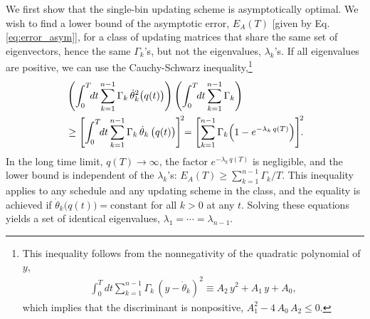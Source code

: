 \documentclass[reprint, superscriptaddress, floatfix]{revtex4-1}
\newcommand{\Err}{E}
\begin{document}
We first show
that the single-bin updating scheme is asymptotically optimal.
%
We wish to find a lower bound of the asymptotic error,
$\Err_A(T)$ [given by Eq. \eqref{eq:error_asym}],
for a class of updating matrices that
share the same set of eigenvectors,
hence the same $\Gamma_k$'s,
but not the eigenvalues,
$\lambda_k$'s.
%
If all eigenvalues are positive,
we can use the Cauchy-Schwarz inequality,\footnote{This
  inequality follows from the nonnegativity of
  the quadratic polynomial of $y$,
  \begin{align*}
  \int_0^T \!\!dt \sum_{k = 1}^{n-1} \Gamma_k \,
      ( y - {\dot \theta}_k )^2
    \equiv
    A_2 \, y^2 + A_1 \, y + A_0
    ,
  \end{align*}
  which implies that the discriminant is nonpositive,
  $A_1^2 - 4 \, A_0 \, A_2 \le 0$.}
%
%
\begin{align}
  &
  \left(
    \int_0^T \!\!dt
      \sum_{k = 1}^{n-1}
        \Gamma_k \, {\dot \theta}_k^2\bigl( q(t) \bigr)
  \right)
  \left(
    \int_0^T \!\!dt
      \sum_{k = 1}^{n-1}
        \Gamma_k
  \right)
  \notag \\
  & %
  \ge
  \Biggl[
    \int_0^T \!\!dt
      \sum_{k = 1}^{n-1}
        \Gamma_k \, {\dot \theta}_k \, \bigl( q(t) \bigr)
  \Biggr]^{\!2}
  \!\!=
  \Biggl[
    \sum_{k = 1}^{n-1} \Gamma_k
      \Bigl(
        1 - e^{ -\lambda_k \, q(T) }
      \Bigr)
  \Biggr]^{\!2}
  \!\!
  .
  \notag
\end{align}
%
In the long time limit, $q(T) \to \infty$,
the factor $e^{-\lambda_k \, q(T)}$ is negligible,
and the lower bound is independent of the $\lambda_k$'s:
$\Err_A(T) \ge \sum_{k=1}^{n-1} \Gamma_k/T$.
%
This inequality applies to any schedule
and any updating scheme in the class,
and the equality is achieved
if $\dot \theta_k\bigl( q(t) \bigr) = \mathrm{constant}$
for all $k > 0$ at any $t$.
%
Solving these equations yields
a set of identical eigenvalues,
$\lambda_1 = \cdots = \lambda_{n-1}$.
\end{document}
